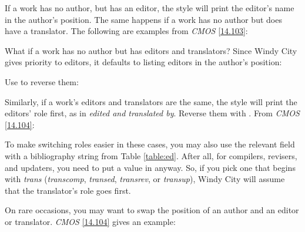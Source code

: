 \documentclass[11pt,letterpaper,oneside]{article}
\begin{document}
If a work has no author, but has an editor, the style will print the
editor's name in the author's position. The same happens if a work has
no author but does have a translator. The following are examples from
\textit{CMOS} \ref{14.103}:

\begin{citebib}
\item \cite[100]{egan2014}
\item \cite[34]{silverstein1974}
\end{citebib}

What if a work has no author but has editors and translators? Since
Windy City gives priority to editors, it defaults to listing editors
in the author's position:

\begin{citebib}
\item \cite{smith2002a}
\end{citebib}

\noindent Use  to reverse them:

\begin{citebib}
\item \cite{smith2002b}
\end{citebib}

Similarly, if a work's editors and translators are the same, the style
will print the editors' role first, as in \textit{edited and
translated by}. Reverse them with . From \textit{CMOS}
\ref{14.104}:

\begin{citebib}
\item \cite{menchu1999}
\end{citebib}

To make switching roles easier in these cases, you may also use the
relevant  field with a bibliography string from
Table \ref{table:ed}. After all, for compilers, revisers, and
updaters, you need to put a value in  anyway. So,
if you pick one that begins with \textit{trans} (\textit{transcomp},
\textit{transed}, \textit{transrev}, or \textit{transup}), Windy City
will assume that the translator's role goes first.

On rare occasions, you may want to swap the position of an author and
an editor or translator. \textit{CMOS} \ref{14.104} gives an example:

\begin{citebib}
\item \cite{pound1953}
\end{citebib}
\end{document}
